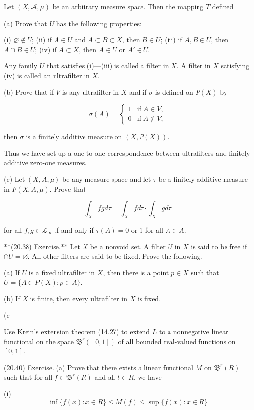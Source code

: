 Let $(X, \mathcal{A}, \mu)$ be an arbitrary measure space. Then the mapping $T$ defined

(a) Prove that $U$ has the following properties:

(i) $\varnothing \notin U$;
(ii) if $A \in U$ and $A \subset B \subset X$, then $B \in U$;
(iii) if $A, B \in U$, then $A \cap B \in U$;
(iv) if $A \subset X$, then $A \in U$ or $A' \in U$.

Any family $U$ that satisfies (i)—(iii) is called a filter in $X$. A filter in $X$ satisfying (iv) is called an ultrafilter in $X$.

(b) Prove that if $V$ is any ultrafilter in $X$ and if $\sigma$ is defined on $P(X)$ by

$$\sigma(A) = \begin{cases} 1 & \text{if } A \in V, \\ 0 & \text{if } A \notin V, \end{cases}$$

then $\sigma$ is a finitely additive measure on $(X, P(X))$.

Thus we have set up a one-to-one correspondence between ultrafilters and finitely additive zero-one measures.

(c) Let $(X, A, \mu)$ be any measure space and let $\tau$ be a finitely additive measure in $F(X, A, \mu)$. Prove that

$$\int_X f g d\tau = \int_X f d\tau \cdot \int_X g d\tau$$

for all $f, g \in \mathcal{L}_\infty$ if and only if $\tau(A) = 0$ or 1 for all $A \in A$.

**(20.38) Exercise.** Let $X$ be a nonvoid set. A filter $U$ in $X$ is said to be free if $\cap U = \varnothing$. All other filters are said to be fixed. Prove the following.

(a) If $U$ is a fixed ultrafilter in $X$, then there is a point $p \in X$ such that $U = \{A \in P(X) : p \in A\}$.

(b) If $X$ is finite, then every ultrafilter in $X$ is fixed.

(c

Use Krein's extension theorem (14.27) to extend $L$ to a nonnegative linear functional on the space $\mathfrak{B}^r([0, 1])$ of all bounded real-valued functions on $[0, 1]$.

(20.40) Exercise. (a) Prove that there exists a linear functional $M$ on $\mathfrak{B}^r(R)$ such that for all $f \in \mathfrak{B}^r(R)$ and all $t \in R$, we have

(i) $$\inf\{f(x): x \in R\} \leq M(f) \leq \sup\{f(x): x \in R\}$$

